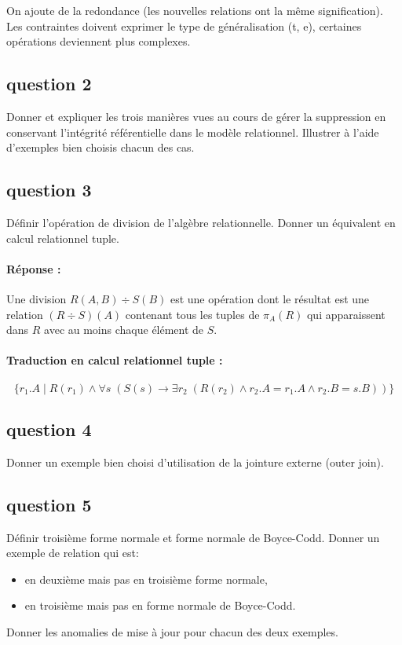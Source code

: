 On ajoute de la redondance (les nouvelles relations ont la m\^eme signification).
Les contraintes doivent exprimer le type de généralisation (t, e), 
certaines opérations deviennent plus complexes.


\subsection{question 2}
	Donner et expliquer les trois manières vues au cours de gérer la suppression en conservant l'intégrité référentielle dans le modèle relationnel. Illustrer à l'aide d'exemples bien choisis chacun des cas.



\subsection{question 3}
	Définir l'opération de division de l'algèbre relationnelle. Donner un équivalent en calcul relationnel tuple.

\paragraph{Réponse :}
Une division $R(A, B) \div S(B)$ est une opération dont le résultat est une relation $(R\div S)(A)$ contenant
tous les tuples de $\pi_A(R)$ qui apparaissent dans $R$ avec au moins chaque élément de $S$.
\paragraph{Traduction en calcul relationnel tuple :}
\[\{r_1.A\;|\;R(r_1)\land\forall s\;(S(s) \rightarrow\exists r_2\;(R(r_2)\land r_2.A=r_1.A\land r_2.B=s.B))\}\]

	
\subsection{question 4}
Donner un exemple bien choisi d’utilisation de la jointure externe (outer join).



\subsection{question 5}
Définir troisième forme normale et forme normale de Boyce-Codd.
Donner un exemple de relation qui est:
\begin{itemize}
	\item en deuxième mais pas en troisième forme normale,
	\item en troisième mais pas en forme normale de Boyce-Codd.
\end{itemize}
Donner les anomalies de mise à jour pour chacun des deux exemples.

